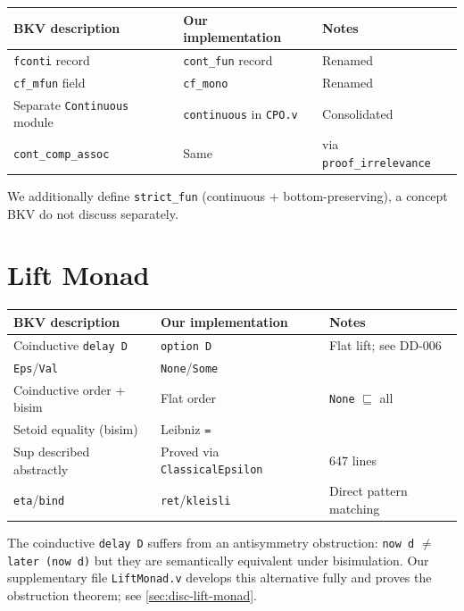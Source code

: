 \begin{center}
\small
\begin{tabular}{@{}l l l@{}}
\toprule
\textbf{BKV description} & \textbf{Our implementation} & \textbf{Notes} \\
\midrule
\texttt{fconti} record        & \texttt{cont\_fun} record & Renamed \\
\texttt{cf\_mfun} field       & \texttt{cf\_mono}         & Renamed \\
Separate \texttt{Continuous} module
  & \texttt{continuous} in \texttt{CPO.v}
  & Consolidated \\
\texttt{cont\_comp\_assoc}    & Same
  & via \texttt{proof\_irrelevance} \\
\bottomrule
\end{tabular}
\end{center}

We additionally define \texttt{strict\_fun} (continuous + bottom-preserving), a concept BKV do not discuss separately.

\section*{Lift Monad}

\begin{table}[h]
\centering
\small
\begin{tabular}{@{}l l l@{}}
\toprule
\textbf{BKV description} & \textbf{Our implementation} & \textbf{Notes} \\
\midrule
Coinductive \texttt{delay D}  & \texttt{option D}
  & Flat lift; see DD-006 \\
\texttt{Eps}/\texttt{Val}     & \texttt{None}/\texttt{Some}
  & \\
Coinductive order + bisim     & Flat order
  & \texttt{None} $\sqsubseteq$ all \\
Setoid equality (bisim)       & Leibniz \texttt{=}
  & \\
Sup described abstractly      & Proved via \texttt{ClassicalEpsilon}
  & 647 lines \\
\texttt{eta}/\texttt{bind}    & \texttt{ret}/\texttt{kleisli}
  & Direct pattern matching \\
\bottomrule
\end{tabular}
\end{table}

The coinductive \texttt{delay D} suffers from an antisymmetry
obstruction: \texttt{now d} $\neq$ \texttt{later (now d)} but they are
semantically equivalent under bisimulation.  Our supplementary file
\texttt{LiftMonad.v} develops this alternative fully and proves
the obstruction theorem; see \cref{sec:disc-lift-monad}.

